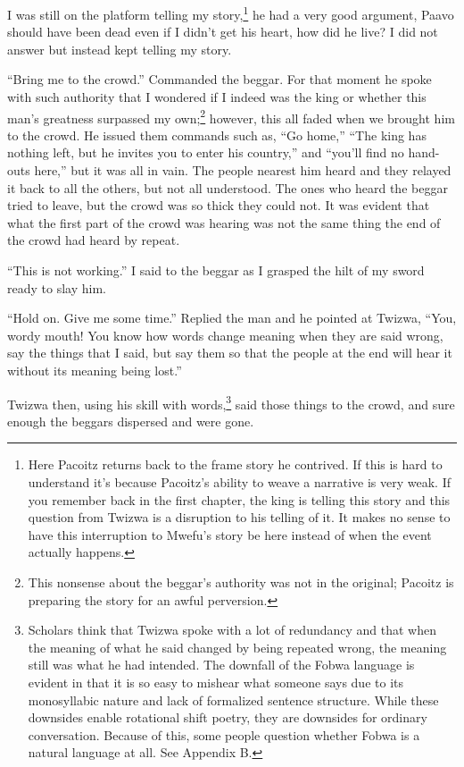 I was still on the platform telling my story,\footnote{Here Pa\-co\-itz returns back to the frame story he contrived. If this is hard to understand it's because Pa\-co\-itz's ability to weave a narrative is very weak. If you remember back in the first chapter, the king is telling this story and this question from Twi\-zwa is a disruption to his telling of it. It makes no sense to have this interruption to Mwe\-fu's story be here instead of when the event actually happens.} he had a very good argument, Paa\-vo should have been dead even if I didn't get his heart, how did he live? I did not answer but instead kept telling my story.

\tbreak

``Bring me to the crowd.'' Commanded the beggar. For that moment he spoke with such authority that I wondered if I indeed was the king or whether this man's greatness surpassed my own;\footnote{This nonsense about the beggar's authority was not in the original; Pa\-co\-itz is preparing the story for an awful perversion.} however, this all faded when we brought him to the crowd.
He issued them commands such as, ``Go home,'' ``The king has nothing left, but he invites you to enter his country,'' and ``you'll find no hand-outs here,'' but it was all in vain. The people nearest him heard and they relayed it back to all the others, but not all understood. The ones who heard the beggar tried to leave, but the crowd was so thick they could not. It was evident that what the first part of the crowd was hearing was not the same thing the end of the crowd had heard by repeat.

``This is not working.'' I said to the beggar as I grasped the hilt of my sword ready to slay him.

``Hold on. Give me some time.'' Replied the man and he pointed at Twi\-zwa, ``You, wordy mouth! You know how words change meaning when they are said wrong, say the things that I said, but say them so that the people at the end will hear it without its meaning being lost.''

Twi\-zwa then, using his skill with words,\footnote{Scholars think that Twi\-zwa spoke with a lot of redundancy and that when the meaning of what he said changed by being repeated wrong, the meaning still was what he had intended. The downfall of the Fo\-bwa language is evident in that it is so easy to mishear what someone says due to its monosyllabic nature and lack of formalized sentence structure. While these downsides enable rotational shift poetry, they are downsides for ordinary conversation. Because of this, some people question whether Fobwa is a natural language at all. See Appendix B.} said those things to the crowd, and sure enough the beggars dispersed and were gone.

